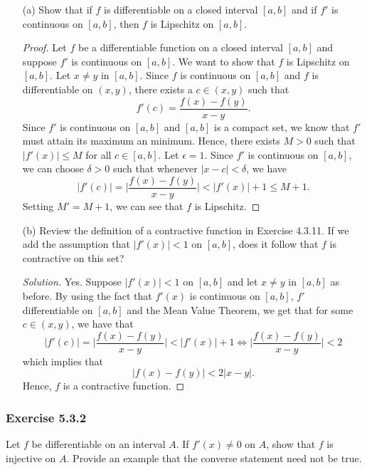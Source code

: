 \begin{enumerate}
    \item[(a)] Show that if \( f  \) is differentiable on a closed interval \( [a,b]  \) and if \( f'  \) is continuous on \( [a,b]  \), then \( f  \) is Lipschitz on \( [a,b]  \).
        \begin{proof}
            Let \( f  \) be a differentiable function on a closed interval \( [a,b]  \) and suppose \( f'  \) is continuous on \( [a,b]  \). We want to show that \( f  \) is Lipschitz on \( [a,b]  \). Let \( x \neq y  \) in \( [a,b]   \). Since \( f  \) is continuous on \( [a,b]  \) and \( f  \) is differentiable on \( (x,y)  \), there exists a \( c \in (x,y)  \) such that 
            \[  f'(c) = \frac{ f(x) - f(y)  }{ x - y  }. \]
            Since \( f' \) is continuous on \( [a,b]  \) and \( [a,b]  \) is a compact set, we know that \( f'  \) must attain its maximum an minimum. Hence, there exists \( M > 0  \) such that \( | f'(x)  | \leq M  \) for all \( c \in [a,b]  \). Let \( \epsilon = 1  \). Since \( f'  \) is continuous on \( [a,b]  \), we can choose \( \delta  > 0   \) such that whenever \( |  x - c  | < \delta  \), we have  
            \[  | f'(c)  | = \Big| \frac{ f(x) - f(y)  }{ x - y  }  \Big|  < | f'(x)  | + 1 \leq M + 1.  \]
            Setting \( M' = M + 1 \), we can see that \( f \) is Lipschitz.
        \end{proof}
    \item[(b)] Review the definition of a contractive function in Exercise 4.3.11. If we add the assumption that \( | f'(x)  | < 1  \) on \( [a,b]  \), does it follow that \( f  \) is contractive on this set? 
    \begin{proof}[Solution]
        Yes. Suppose \( | f'(x) | < 1  \) on \( [a,b]  \) and let \( x \neq y  \) in \( [a,b] \) as before. By using the fact that \( f'(x)  \) is continuous on \( [a,b]  \), \( f'  \) differentiable on \( [a,b]  \) and the Mean Value Theorem, we get that for some \( c \in (x,y)  \), we have that 
        \[  | f'(c)  | = \Big| \frac{ f(x) - f(y)   }{ x-y }  \Big| < | f'(x)  | + 1 \iff \Big| \frac{ f(x) - f(y)  }{ x - y  }  \Big| < 2\]
        which implies that 
        \[  | f(x) - f(y)  | < 2 | x - y  |. \]
        Hence, \( f  \) is a contractive function.
    \end{proof}
\end{enumerate}

\subsubsection{Exercise 5.3.2} Let \( f  \) be differentiable on an interval \( A  \). If \( f'(x) \neq 0  \) on \( A  \), show that \( f  \) is injective on \( A  \). Provide an example that the converse statement need not be true.

